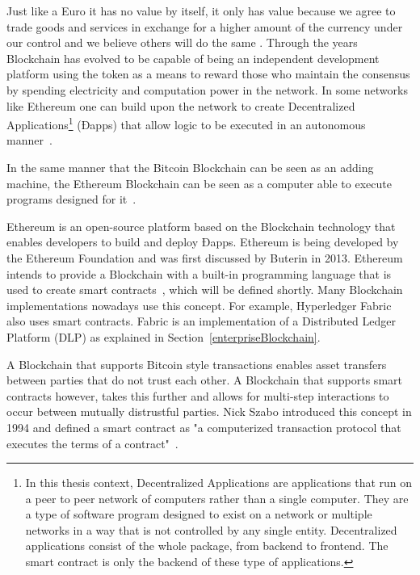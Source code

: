 Just like a Euro it has no value by itself, it only has value because we agree
to trade goods and services in exchange for a higher amount of the currency
under our control and we believe others will do the same \cite{aliessi2016}.
Through the years Blockchain has evolved to be capable of being an independent
development platform using the token as a means to reward those who maintain
the consensus by spending electricity and computation power in the network. In
some networks like Ethereum one can build upon the network to create
Decentralized Applications\footnote{In this thesis context, Decentralized
Applications are applications that run on a peer to peer network of computers
rather than a single computer. They are a type of software program designed to
exist on a network or multiple networks in a way that is not controlled by any
single entity. Decentralized applications consist of the whole package, from
backend to frontend. The smart contract is only the backend of these type of
applications.} (Ðapps) that allow logic to be executed in an autonomous
manner~\cite{Wood2017}. 

In the same manner that the Bitcoin Blockchain can be seen as an adding
machine, the Ethereum Blockchain can be seen as a computer able to execute
programs designed for it~\cite{Wood2015}.

Ethereum is an open-source platform based on the Blockchain technology that
enables developers to build and deploy Ðapps. Ethereum is being developed by
the Ethereum Foundation and was first discussed by Buterin in 2013. Ethereum
intends to provide a Blockchain with a built-in programming language that is
used to create smart contracts~\cite{Wood2017}, which will be defined shortly.
Many Blockchain implementations nowadays use this concept. For example,
Hyperledger Fabric also uses smart contracts. Fabric is an implementation of a
Distributed Ledger Platform (DLP) as explained in
Section~\ref{enterpriseBlockchain}.

A Blockchain that supports Bitcoin style transactions enables asset transfers
between parties that do not trust each other. A Blockchain that supports smart
contracts however, takes this further and allows for multi-step interactions to
occur between mutually distrustful parties. Nick Szabo introduced this concept
in 1994 and defined a smart contract as "a computerized transaction protocol
that executes the terms of a contract"~\cite{Christidis2016}. 


